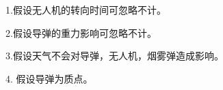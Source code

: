\documentclass[../main.tex]{subfiles}
\begin{document}
\par 1.假设无人机的转向时间可忽略不计。


\par  2.假设导弹的重力影响可忽略不计。



\par  3.假设天气不会对导弹，无人机，烟雾弹造成影响。



\par  4. 假设导弹为质点。
\end{document}
